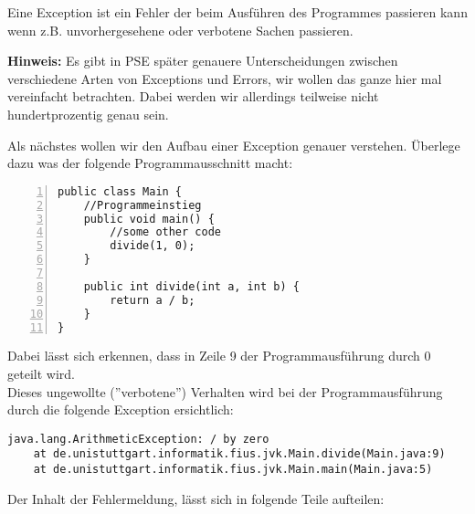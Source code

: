 \begin{Infobox}[Exceptions]
    Eine Exception ist ein Fehler der beim Ausführen des Programmes passieren kann wenn z.B. unvorhergesehene oder verbotene Sachen passieren.\newline

    \textbf{Hinweis:} Es gibt in PSE später genauere Unterscheidungen zwischen verschiedene Arten von Exceptions und Errors, wir wollen das ganze hier mal vereinfacht betrachten.
    Dabei werden wir allerdings teilweise nicht hundertprozentig genau sein.\newline

    Als nächstes wollen wir den Aufbau einer Exception genauer verstehen.
    Überlege dazu was der folgende Programmausschnitt macht:

    \begin{lstlisting}[numbers=left,xleftmargin=2em,frame=single,framexleftmargin=1.5em]
public class Main {
    //Programmeinstieg
    public void main() {
        //some other code
        divide(1, 0);
    }

    public int divide(int a, int b) {
        return a / b;
    }
}
    \end{lstlisting}

    Dabei lässt sich erkennen, dass in Zeile 9 der Programmausführung durch 0 geteilt wird.\\
    Dieses ungewollte (''verbotene'') Verhalten wird bei der Programmausführung durch die folgende Exception ersichtlich:

    \begin{lstlisting}[keywords={}, breaklines=true, numbers=none]
java.lang.ArithmeticException: / by zero
    at de.unistuttgart.informatik.fius.jvk.Main.divide(Main.java:9)
    at de.unistuttgart.informatik.fius.jvk.Main.main(Main.java:5)
    \end{lstlisting}

    Der Inhalt der Fehlermeldung, lässt sich in folgende Teile aufteilen:


\end{Infobox}
